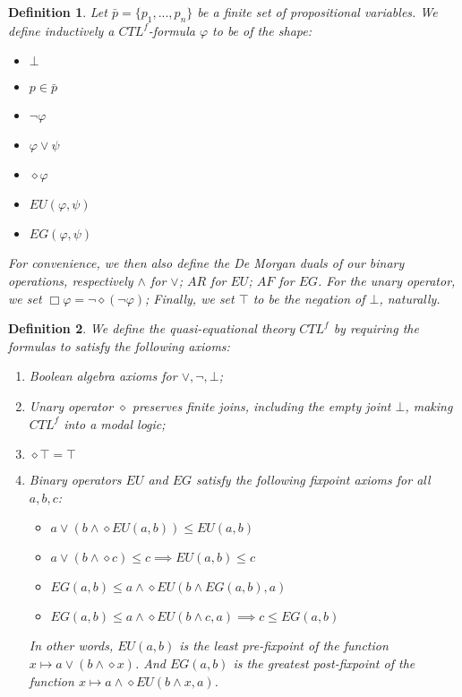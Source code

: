 \documentclass[11pt]{article}
\newtheorem{definition}{Definition}[section]
\begin{document}
\begin{definition}\label{CTLf_formulas}
    Let $\bar{p}= \{p_1,...,p_n \}$ be a finite set of propositional variables. We define inductively a \emph{$CTL^{f}$-formula} $\varphi$ to be of the shape:
    \begin{itemize}
        \setlength\itemsep{0em}
        \item[-] $\bot$
        \item[-] $p \in \bar{p}$
        \item[-] $\neg \varphi$
        \item[-] $\varphi \vee \psi$
        \item[-] $\diamond \varphi$
        \item[-] $EU(\varphi,\psi)$
        \item[-] $EG(\varphi,\psi)$ 
    \end{itemize}
    For convenience, we then also define the De Morgan duals of our binary operations, respectively $\wedge$ for $\vee$; $AR$ for $EU$; $AF$ for $EG$. For the unary operator, we set $\Box \varphi = \neg \diamond(\neg \varphi)$; Finally, we set $\top$ to be the negation of $\bot$, naturally.
\end{definition}

\begin{definition}\label{quasi_eq_CTLf}
    We define the \emph{quasi-equational theory $CTL^{f}$} by requiring the formulas to satisfy the following axioms:
    \begin{enumerate}
        \setlength\itemsep{0em}
        \item Boolean algebra axioms for $\vee,\neg,\bot$;
        \item Unary operator $\diamond$ preserves finite joins, including the empty joint $\bot$, making $CTL^f$ into a modal logic;
        \item $\diamond \top = \top$
        \item Binary operators $EU$ and $EG$ satisfy the following \emph{fixpoint axioms} for all $a,b,c$:
        \begin{itemize}
            \item[-] $a \vee (b \wedge \diamond EU(a,b)) \leq EU(a,b)$
            \item[-] $a \vee (b \wedge \diamond c) \leq c \implies EU(a,b) \leq c$ 
            \item[-] $EG(a,b)\leq a\wedge \diamond EU(b\wedge EG(a,b),a)$
            \item[-] $EG(a,b)\leq a\wedge \diamond EU(b\wedge c,a) \implies c \leq EG(a,b)$
        \end{itemize}
        In other words, $EU(a,b)$ is the \emph{least pre-fixpoint} of the function $x \mapsto a \vee (b \wedge \diamond x)$.
        And $EG(a,b)$ is the \emph{greatest post-fixpoint} of the function $x \mapsto a\wedge \diamond EU(b\wedge x,a)$.
    \end{enumerate}
\end{definition}
\end{document}
